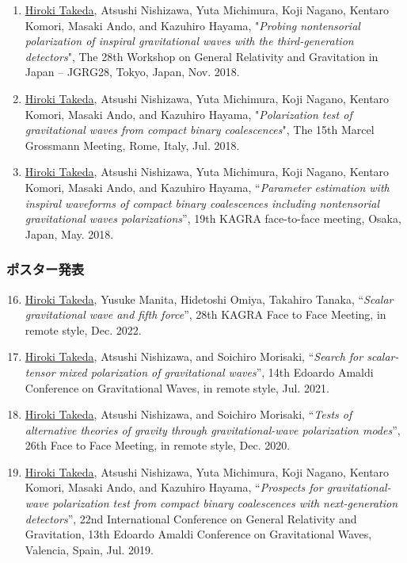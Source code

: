 \documentclass[uplatex, 11pt]{jsarticle}
\begin{document}
\begin{enumerate}
\item \uline{Hiroki Takeda}, Atsushi Nishizawa, Yuta Michimura, Koji Nagano, Kentaro Komori, Masaki Ando, and Kazuhiro Hayama, "\emph{Probing nontensorial polarization of inspiral gravitational waves with the third-generation detectors}", The 28th Workshop on General Relativity and Gravitation in Japan – JGRG28, Tokyo, Japan, Nov. 2018.\\

\item \uline{Hiroki Takeda}, Atsushi Nishizawa, Yuta Michimura, Koji Nagano, Kentaro Komori, Masaki Ando, and Kazuhiro Hayama, "\emph{Polarization test of gravitational waves from compact binary coalescences}", The 15th Marcel Grossmann Meeting, Rome, Italy, Jul. 2018.\\

\item \uline{Hiroki Takeda}, Atsushi Nishizawa, Yuta Michimura, Koji Nagano, Kentaro Komori, Masaki Ando, and Kazuhiro Hayama, “\emph{Parameter estimation with inspiral waveforms of compact binary coalescences including nontensorial gravitational waves polarizations}”, 19th KAGRA face-to-face meeting, Osaka, Japan, May. 2018.
\end{enumerate}

\subsubsection*{ポスター発表}

\begin{enumerate}
\setcounter{enumi}{15}
\item \uline{Hiroki Takeda}, Yusuke Manita, Hidetoshi Omiya, Takahiro Tanaka, “\emph{Scalar gravitational wave and fifth force}”, 28th KAGRA Face to Face Meeting, in remote style, Dec. 2022.\\

\item \uline{Hiroki Takeda}, Atsushi Nishizawa, and Soichiro Morisaki, “\emph{Search for scalar-tensor mixed polarization of gravitational waves}”, 14th Edoardo Amaldi Conference on Gravitational Waves, in remote style, Jul. 2021.\\

\item \uline{Hiroki Takeda}, Atsushi Nishizawa, and Soichiro Morisaki, “\emph{Tests of alternative theories of gravity through gravitational-wave polarization modes}”, 26th Face to Face Meeting, in remote style, Dec. 2020.\\

\item \uline{Hiroki Takeda}, Atsushi Nishizawa, Yuta Michimura, Koji Nagano, Kentaro Komori, Masaki Ando, and Kazuhiro Hayama, “\emph{Prospects for gravitational-wave polarization test from compact binary coalescences with next-generation detectors}”, 22nd International Conference on General Relativity and Gravitation, 13th Edoardo Amaldi Conference on Gravitational Waves, Valencia, Spain, Jul. 2019.\\

\end{enumerate}
\end{document}

